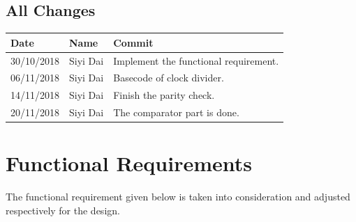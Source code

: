\documentclass[a4paper, twoside]{report}
\begin{document}

\section{All Changes}\label{All changes}
\begin{flushleft}
    \begin{tabular}{ | l | l | p{11cm} |}
    \hline
    Date & Name & Commit \\ \hline
    30/10/2018 & Siyi Dai & Implement the functional requirement. \\ \hline
    06/11/2018 & Siyi Dai & Basecode of clock divider. \\ \hline
    14/11/2018 & Siyi Dai & Finish the parity check. \\ \hline
    20/11/2018 & Siyi Dai & The comparator part is done. \\ \hline
    \end{tabular}
\end{flushleft}

\chapter{Functional Requirements}

The functional requirement given below is taken into consideration and adjusted respectively for the design.
\end{document}
